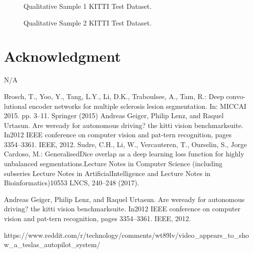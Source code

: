 \documentclass[Location Location Location! : Exploring Image Segmentation Problem In Urban Driving Scenarios]{IEEEtran}
\begin{document}
\begin{figure}[htbp]
\caption{Qualitative Sample 1 KITTI Test Dataset.}
\label{kitti-sample-1}
\end{figure}


\begin{figure}[htbp]
\caption{Qualitative Sample 2 KITTI Test Dataset.}
\label{kitti-sample-2}
\end{figure}



\section*{Acknowledgment}

N/A

\begin{thebibliography}{00}
 Brosch, T., Yoo, Y., Tang, L.Y., Li, D.K., Traboulsee, A., Tam, R.: Deep convo-
lutional encoder networks for multiple sclerosis lesion segmentation. In: MICCAI
2015. pp. 3–11. Springer (2015)
Andreas Geiger, Philip Lenz, and Raquel Urtasun.  Are weready for autonomous driving?   the kitti vision benchmarksuite. In2012 IEEE conference on computer vision and pat-tern recognition, pages 3354–3361. IEEE, 2012.
 Sudre, C.H., Li, W., Vercauteren, T., Ourselin, S., Jorge Cardoso, M.: GeneralisedDice overlap as a deep learning loss function for highly unbalanced segmentations.Lecture Notes in Computer Science (including subseries Lecture Notes in ArtificialIntelligence and Lecture Notes in Bioinformatics)10553 LNCS, 240–248 (2017).

 Andreas Geiger, Philip Lenz, and Raquel Urtasun.  Are weready for autonomous driving?   the kitti vision benchmarksuite. In2012 IEEE conference on computer vision and pat-tern recognition, pages 3354–3361. IEEE, 2012.

 https://www.reddit.com/r/technology/comments/wt89lv/video_appears_to_show_a_teslas_autopilot_system/


\end{thebibliography}
\vspace{12pt}
\end{document}
